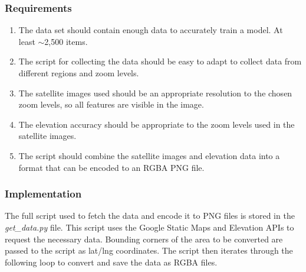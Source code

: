 \documentclass[a4paper]{report}
\begin{document}
\subsubsection{Requirements}
\begin{enumerate}
    \item The data set should contain enough data to accurately train a model. At least $\sim$2,500 items.
    \item The script for collecting the data should be easy to adapt to collect data from different regions and zoom levels.
    \item The satellite images used should be an appropriate resolution to the chosen zoom levels, so all features are visible in the image.
    \item The elevation accuracy should be appropriate to the zoom levels used in the satellite images.
    \item The script should combine the satellite images and elevation data into a format that can be encoded to an RGBA PNG file.
\end{enumerate}
\subsubsection{Implementation}
The full script used to fetch the data and encode it to PNG files is stored in the \textit{get\_data.py} file. This script uses the Google Static Maps and Elevation APIs to request the necessary data. Bounding corners of the area to be converted are passed to the script as lat/lng coordinates. The script then iterates through the following loop to convert and save the data as RGBA files.
\end{document}
